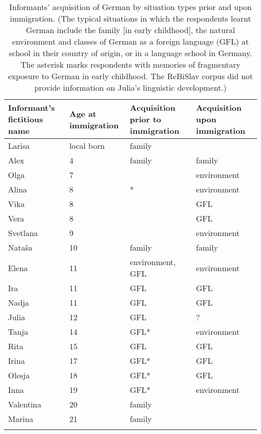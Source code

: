 \begin{table} 
\begin{small}
		\begin{tabular}{p{7em}<{\raggedright}p{7em}<{\raggedright}p{7.5em}<{\raggedright}p{7em}<{\raggedright}} 
		\lsptoprule
        Informant's fictitious name & Age at immigration & Acquisition prior to immigration & Acquisition upon immigration \\\midrule
		Larisa & local born & family & \\
		Alex & 4 & family & family\\
		Olga & 7 & & environment\\
		Alina & 8 & * & environment\\
		Vika & 8 & & GFL\\
		Vera & 8 & & GFL\\	
		Svetlana & 9 & & environment\\
		Nataša & 10 & family & family\\
		Elena & 11 & environment, GFL & environment\\
		Ira & 11 & GFL & GFL \\
		Nadja & 11 & GFL & GFL \\
		Julia & 12 & GFL & ?\\
		Tanja & 14 & GFL* & environment\\
		Rita & 15 & GFL & GFL\\
		Irina & 17 & GFL* & GFL\\
		Olesja & 18 & GFL* & GFL\\
		Inna & 19 & GFL* & environment\\
		Valentina & 20 & family & \\
		Marina & 21 & family & \\
		\lspbottomrule
	\end{tabular}
\end{small}
	\caption{Informants' acquisition of German by situation types prior and upon immigration. (The typical situations in which the respondents learnt German include the family [in early childhood], the natural environment and classes of German as a foreign language (GFL) at school in their country of origin, or in a language school in Germany. The asterisk marks respondents with memories of fragmentary exposure to German in early childhood. The ReBiSlav corpus did not provide information on Julia's linguistic development.)\label{tab:3:4}}
\end{table}

